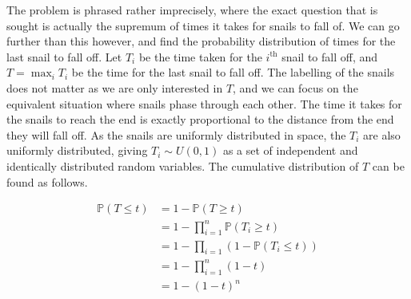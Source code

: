 The problem is phrased rather imprecisely, where the exact question that is sought is actually the supremum of times it takes for snails to fall of. We can go further than this however, and find the probability distribution of times for the last snail to fall off. Let $T_i$ be the time taken for the $i^\text{th}$ snail to fall off, and $T = \max_i{T_i}$ be the time for the last snail to fall off. The labelling of the snails does not matter as we are only interested in $T$, and we can focus on the equivalent situation where snails phase through each other. The time it takes for the snails to reach the end is exactly proportional to the distance from the end they will fall off. As the snails are uniformly distributed in space, the $T_i$ are also uniformly distributed, giving $T_i \sim U(0, 1)$ as a set of independent and identically distributed random variables. The cumulative distribution of $T$ can be found as follows.

\begin{align*}
    \mathbb{P}(T \le t) &= 1 - \mathbb{P}(T \ge t)  \\
    &= 1 - \prod_{i=1}^n \mathbb{P}(T_i \ge t)  \\
    &= 1 - \prod_{i=1} \left(1 - \mathbb{P}(T_i \le t)\right)  \\
    &= 1 - \prod_{i=1}^n (1 - t)  \\
    &= 1 - (1 - t)^n
\end{align*}